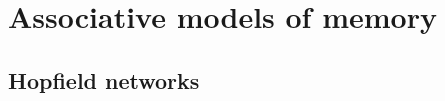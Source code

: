 \documentclass[10pt,letterpaper]{article}
\begin{document}







\section{Associative models of memory}



\cite{Keeler1988}

\subsection{Hopfield networks}
\cite{Hopfield1982}


% 



\end{document}
